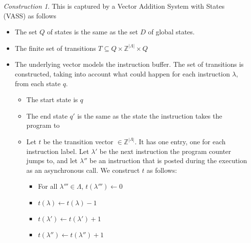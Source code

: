 \documentclass{article}
\theoremstyle{remark}
\newtheorem{construction}{Construction}[section]
\newcommand{\integers}{\mathbb{Z}}
\begin{document}
\begin{construction}
This is captured by a Vector Addition System with States (VASS) as follows
\begin{itemize}
\item The set $Q$ of states is the same as the set $D$ of global states.
\item The finite set of transitions $T \subseteq Q \times \integers^{|\Lambda|} \times Q$
\item The underlying vector models the instruction buffer. The set of transitions is constructed, taking into account what could happen for each instruction $\lambda$, from each state $q$.
\begin{itemize}
\item The start state is $q$
\item The end state $q'$ is the same as the state the instruction takes the program to
\item Let $t$ be the transition vector $\in \integers^{|\Lambda|}$. It has one entry, one for each instruction label. Let $\lambda'$ be the next instruction the program counter jumps to, and let $\lambda''$ be an instruction that is posted during the execution as an asynchronous call. We construct $t$ as follows:  
\begin{itemize}
\item For all $\lambda''' \in \Lambda$, $t(\lambda''') \gets 0$
\item $t(\lambda) \gets t(\lambda) - 1$
\item $ t(\lambda') \gets t(\lambda') + 1$
\item  $t(\lambda'') \gets t(\lambda'') + 1$
\end{itemize}
\end{itemize}
\end{itemize}
\end{construction}
\end{document}
